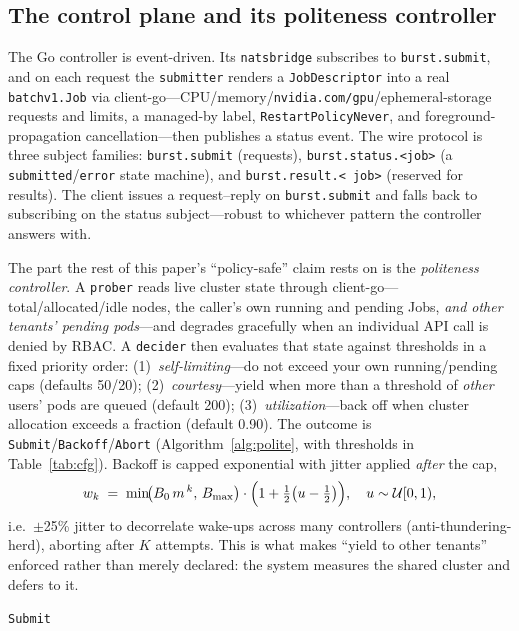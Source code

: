 \documentclass[conference]{IEEEtran}
\begin{document}
\subsection{The control plane and its politeness controller}
The Go controller is event-driven. Its \texttt{natsbridge} subscribes to \texttt{burst.submit},
and on each request the \texttt{submitter} renders a \texttt{JobDescriptor} into a real
\texttt{batchv1.Job} via client-go---CPU/memory/\texttt{nvidia.com/gpu}/ephemeral-storage requests
and limits, a managed-by label, \texttt{RestartPolicyNever}, and foreground-propagation
cancellation---then publishes a status event. The wire protocol is three subject families:
\texttt{burst.submit} (requests), \texttt{burst.status.\textless job\textgreater} (a
\texttt{submitted}/\texttt{error} state machine), and \texttt{burst.result.\textless
job\textgreater} (reserved for results). The client issues a request--reply on
\texttt{burst.submit} and falls back to subscribing on the status subject---robust to whichever
pattern the controller answers with.

The part the rest of this paper's ``policy-safe'' claim rests on is the \emph{politeness
controller}. A \texttt{prober} reads live cluster state through client-go---total/allocated/idle
nodes, the caller's own running and pending Jobs, \emph{and other tenants' pending pods}---and
degrades gracefully when an individual API call is denied by RBAC. A \texttt{decider} then
evaluates that state against thresholds in a fixed priority order: (1)~\emph{self-limiting}---do
not exceed your own running/pending caps (defaults 50/20); (2)~\emph{courtesy}---yield when more
than a threshold of \emph{other} users' pods are queued (default 200); (3)~\emph{utilization}---back
off when cluster allocation exceeds a fraction (default 0.90). The outcome is
\texttt{Submit}/\texttt{Backoff}/\texttt{Abort} (Algorithm~\ref{alg:polite}, with thresholds in
Table~\ref{tab:cfg}). Backoff is capped exponential with jitter applied \emph{after} the cap,
\begin{equation}
w_k \;=\; \min\!\bigl(B_0\,m^{\,k},\,B_{\max}\bigr)\cdot\Bigl(1 + \tfrac12\bigl(u-\tfrac12\bigr)\Bigr),
\quad u\sim\mathcal U[0,1),
\end{equation}
i.e.\ $\pm$25\% jitter to decorrelate wake-ups across many controllers (anti-thundering-herd),
aborting after $K$ attempts. This is what makes ``yield to other tenants'' enforced rather than
merely declared: the system measures the shared cluster and defers to it.

\begin{algorithm}[t]
\caption{Polite admission decision}\label{alg:polite}
\Return \texttt{Submit}\;
\end{algorithm}
\end{document}
